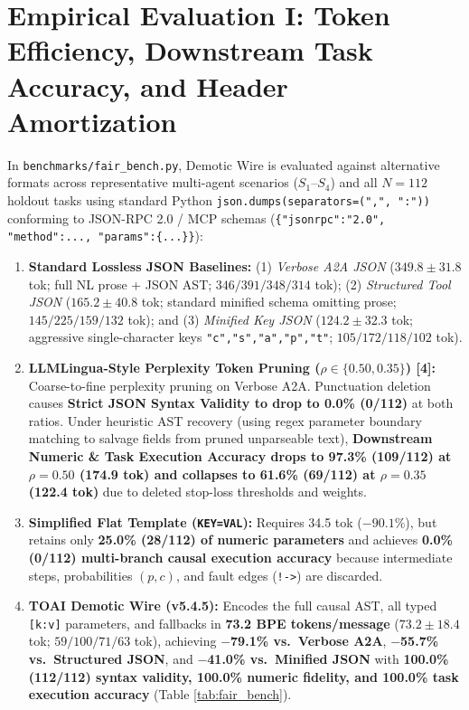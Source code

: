 \documentclass[9pt,a4paper]{extarticle}
\begin{document}
\section{Empirical Evaluation I: Token Efficiency, Downstream Task Accuracy, and Header Amortization}
In \texttt{benchmarks/fair\_bench.py}, Demotic Wire is evaluated against alternative formats across representative multi-agent scenarios ($S_1\text{--}S_4$) and all $N=112$ holdout tasks using standard Python \texttt{json.dumps(separators=(",", ":"))} conforming to JSON-RPC 2.0 / MCP schemas (\texttt{\{"jsonrpc":"2.0", "method":..., "params":\{...\}\}}):
\begin{enumerate}
  \item \textbf{Standard Lossless JSON Baselines:} (1) \emph{Verbose A2A JSON} ($349.8 \pm 31.8$ tok; full NL prose + JSON AST; $346 / 391 / 348 / 314$ tok); (2) \emph{Structured Tool JSON} ($165.2 \pm 40.8$ tok; standard minified schema omitting prose; $145 / 225 / 159 / 132$ tok); and (3) \emph{Minified Key JSON} ($124.2 \pm 32.3$ tok; aggressive single-character keys \texttt{"c","s","a","p","t"}; $105 / 172 / 118 / 102$ tok).
  \item \textbf{LLMLingua-Style Perplexity Token Pruning ($\rho \in \{0.50, 0.35\}$) [4]:} Coarse-to-fine perplexity pruning on Verbose A2A. Punctuation deletion causes \textbf{Strict JSON Syntax Validity to drop to 0.0\% (0/112)} at both ratios. Under heuristic AST recovery (using regex parameter boundary matching to salvage fields from pruned unparseable text), \textbf{Downstream Numeric \& Task Execution Accuracy drops to 97.3\% (109/112) at $\rho=0.50$ (174.9 tok) and collapses to 61.6\% (69/112) at $\rho=0.35$ (122.4 tok)} due to deleted stop-loss thresholds and weights.
  \item \textbf{Simplified Flat Template (\texttt{KEY=VAL}):} Requires 34.5 tok ($-90.1\%$), but retains only \textbf{25.0\% (28/112) of numeric parameters} and achieves \textbf{0.0\% (0/112) multi-branch causal execution accuracy} because intermediate steps, probabilities $(p,c)$, and fault edges (\texttt{!->}) are discarded.
  \item \textbf{TOAI Demotic Wire (v5.4.5):} Encodes the full causal AST, all typed \texttt{[k:v]} parameters, and fallbacks in \textbf{73.2 BPE tokens/message} ($73.2 \pm 18.4$ tok; $59 / 100 / 71 / 63$ tok), achieving \textbf{$-$79.1\% vs.\ Verbose A2A}, \textbf{$-$55.7\% vs.\ Structured JSON}, and \textbf{$-$41.0\% vs.\ Minified JSON} with \textbf{100.0\% (112/112) syntax validity, 100.0\% numeric fidelity, and 100.0\% task execution accuracy} (Table \ref{tab:fair_bench}).
\end{enumerate}
\end{document}
